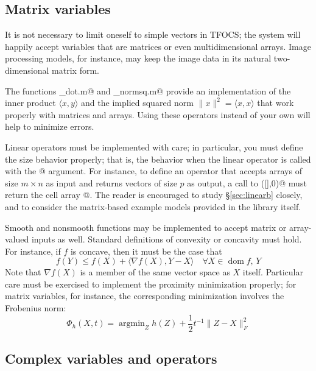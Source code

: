 \documentclass{article}
\DeclareMathOperator*{\argmin}{argmin}
\newcommand\thalf{{\textstyle\frac{1}{2}}}
\newcommand{\<}{\langle}
\renewcommand{\>}{\rangle}
\newcommand\dom{\operatorname{\textrm{dom}}}
\begin{document}
\subsection{Matrix variables}
\label{sec:matvec}

It is not necessary to limit oneself to simple vectors in TFOCS;
the system will happily accept variables that are matrices or
even multidimensional arrays. Image processing
models, for instance,
may keep the image data in its natural two-dimensional  
matrix form.

The functions \verb@tfocs_dot.m@ and \verb@tfocs_normsq.m@ 
provide an implementation of the inner product $\<x,y\>$ 
and the implied squared norm $\|x\|^2=\<x,x\>$ that work
properly with matrices and arrays. Using these operators
instead of your own will help to minimize errors.

Linear operators must be implemented with care; in particular, you 
must define the size behavior properly; that is, the behavior
when the linear operator is called with the @
argument. For instance, to define an operator \verb@linearF@
that accepts
arrays of size $m\times n$ as input and returns vectors of
size $p$ as output, a call to \verb@linearF([],0)@ must
return the cell array \verb@{[m,n],[p,1]}@. The reader
is encouraged to study \S\ref{sec:linearb} closely, and to
consider the matrix-based example models provided in the library itself.

Smooth and nonsmooth functions may be implemented
to accept matrix or array-valued inputs as well. Standard
definitions of convexity or concavity must hold. For instance,
if $f$ is concave, then it must be the case that
\begin{equation}
	f(Y) \leq f(X) + \< \nabla f(X), Y - X \> \quad \forall X\in\dom f,\,Y
\end{equation}
Note that $\nabla f(X)$ is a member of the same vector space as $X$ itself.
Particular care must be exercised to implement the proximity minimization
properly; for matrix variables, for instance, the corresponding 
minimization involves the Frobenius norm:
\begin{equation}
	\Phi_h(X,t) = \argmin_Z h(Z) + \thalf t^{-1} \|Z-X\|_F^2
\end{equation}

\subsection{Complex variables and operators}
\end{document}
